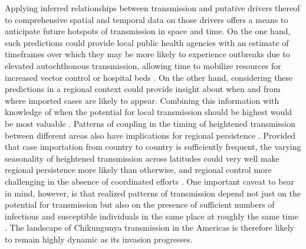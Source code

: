 \documentclass[11pt]{article}
\begin{document}
Applying inferred relationships between transmission and putative drivers thereof to comprehensive spatial and temporal data on those drivers offers a means to anticipate future hotspots of transmission in space and time. On the one hand, such predictions could provide local public health agencies with an estimate of timeframes over which they may be more likely to experience outbreaks due to elevated autochthonous transmission, allowing time to mobilize resources for increased vector control or hospital beds \cite{Hii2012}. On the other hand, considering these predictions in a regional context could provide insight about when and from where imported cases are likely to appear. Combining this information with knowledge of when the potential for local transmission should be highest would be most valuable \cite{Chowell2011}. Patterns of coupling in the timing of heightened transmission between different areas also have implications for regional persistence \cite{Bolker1995,Grenfell1997}. Provided that case importation from country to country is sufficiently frequent, the varying seasonality of heightened transmission across latitudes could very well make regional persistence more likely than otherwise, and regional control more challenging in the absence of coordinated efforts \cite{Bahl2011,Klepac2011,Metcalf2010}. One important caveat to bear in mind, however, is that realized patterns of transmission depend not just on the potential for transmission but also on the presence of sufficient numbers of infectious and susceptible individuals in the same place at roughly the same time \cite{Metcalf2011}. The landscape of Chikungunya transmission in the Americas is therefore likely to remain highly dynamic as its invasion progresses.
\end{document}
